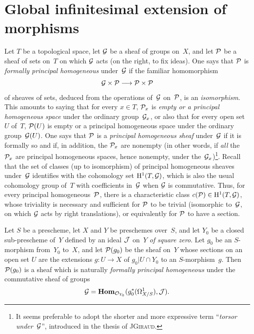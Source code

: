 \section{Global infinitesimal extension of morphisms}
\label{III.5}

Let $T$ be a topological space, let $\cal{G}$ be a sheaf of groups
on~$X$, and let $\cal{P}$ be a sheaf of sets on~$T$ on which
$\cal{G}$ acts (on the right, to fix ideas). One says that $\cal{P}$ is
\emph{formally principal homogeneous} under~$\cal{G}$ if the familiar
homomorphism
$$
\cal{G}\times \cal{P}\to \cal{P}\times \cal{P}
$$
of sheaves of sets, deduced from the operations of~$\cal{G}$ on~$\cal{P}$,
is an {\emph{isomorphism}}. This amounts to saying that for every
$x\in T$, $\cal{P}_x$ is {\emph{empty or a principal homogeneous space}}
under the ordinary group~$\cal{G}_x$, or also that for every open set
$U$ of~$T$, $\cal{P}(U)$ is empty or a principal homogeneous space under
the ordinary group~$\cal{G}(U)$. One says that $\cal{P}$ is a
{\emph{principal homogeneous sheaf}} under~$\cal{G}$ if it is formally
so and if, in addition, the $\cal{P}_x$ are nonempty (in other words, if
{\emph{all}} the $\cal{P}_x$ are principal homogeneous spaces, hence
nonempty, under the~$\cal{G}_x$)\footnote{It seems preferable to adopt the shorter and more expressive term
``{\emph{torsor under}}~$\cal{G}$'', introduced in the thesis of
J\ptbl\textsc{Giraud}.}. Recall that the set of classes (up to
isomorphism) of principal homogeneous sheaves under~$\cal{G}$ identifies
with the cohomology set $\H^1(T,\cal{G})$, which is also the usual
cohomology group of~$T$ with coefficients in~$\cal{G}$ when $\cal{G}$ is
commutative. Thus, for every principal homogeneous~$\cal{P}$, there is
a characteristic class $c(\cal{P})\in\H^1(T,\cal{G})$, whose triviality
is necessary and sufficient for $\cal{P}$ to be trivial (\ie isomorphic
to~$\cal{G}$, on which $\cal{G}$ acts by right translations), or
 equivalently for $\cal{P}$ to have a section.

\begin{proposition}
\label{III.5.1}
Let $S$ be a prescheme, let $X$ and $Y$ be preschemes over~$S$, and let
$Y_0$ be a closed sub-prescheme of~$Y$ defined by an ideal $\cal{J}$ on~$Y$
{\emph{of square zero}}. Let $g_0$ be an $S$-morphism from~$Y_0$ to~$X$,
and let $\cal{P}(g_0)$ be the sheaf on~$Y$ whose sections on an open set
$U$ are the extensions $g\colon U\to X$ of $g_0|U\cap Y_0$ to an
$S$-morphism~$g$. Then $\cal{P}(g_0)$ is a sheaf which is naturally
{\emph{formally principal homogeneous}} under the commutative sheaf of
groups
$$
\cal{G}=\SheafHom_{\cal{O}_{Y_0}}(g_0^*(\Omega^1_{X/S}),\cal{J}).
$$
\end{proposition}

